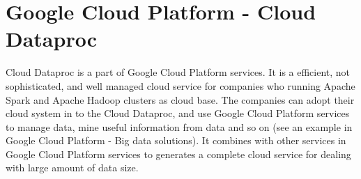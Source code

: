 \section{Google Cloud Platform - Cloud Dataproc}

Cloud Dataproc is a part of Google Cloud Platform services. It is a efficient, not sophisticated, and well managed cloud service for companies who running Apache Spark and Apache Hadoop clusters as cloud base. The companies can adopt their cloud system in to the Cloud Dataproc, and use Google Cloud Platform services to manage data, mine useful information from data and so on (see an example in Google Cloud Platform - Big data solutions). It combines with other services in Google Cloud Platform services to generates a complete cloud service for dealing with large amount of data size\cite{GoogleCP_CD}.
